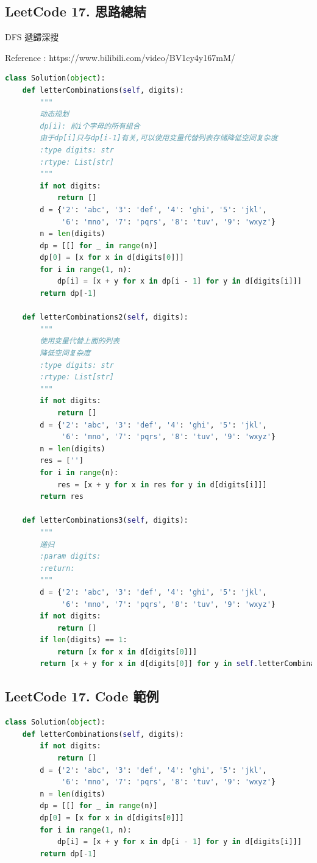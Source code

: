 \documentclass[10pt,UTF8]{ctexart}
\begin{document}
\subsection{LeetCode 17. 思路總結}

DFS 遞歸深搜

Reference : https://www.bilibili.com/video/BV1cy4y167mM/

\begin{lstlisting}[language={python}]
class Solution(object):
    def letterCombinations(self, digits):
        """
        动态规划
        dp[i]: 前i个字母的所有组合
        由于dp[i]只与dp[i-1]有关,可以使用变量代替列表存储降低空间复杂度
        :type digits: str
        :rtype: List[str]
        """
        if not digits:
            return []
        d = {'2': 'abc', '3': 'def', '4': 'ghi', '5': 'jkl',
             '6': 'mno', '7': 'pqrs', '8': 'tuv', '9': 'wxyz'}
        n = len(digits)
        dp = [[] for _ in range(n)]
        dp[0] = [x for x in d[digits[0]]]
        for i in range(1, n):
            dp[i] = [x + y for x in dp[i - 1] for y in d[digits[i]]]
        return dp[-1]

    def letterCombinations2(self, digits):
        """
        使用变量代替上面的列表
        降低空间复杂度
        :type digits: str
        :rtype: List[str]
        """
        if not digits:
            return []
        d = {'2': 'abc', '3': 'def', '4': 'ghi', '5': 'jkl',
             '6': 'mno', '7': 'pqrs', '8': 'tuv', '9': 'wxyz'}
        n = len(digits)
        res = ['']
        for i in range(n):
            res = [x + y for x in res for y in d[digits[i]]]
        return res

    def letterCombinations3(self, digits):
        """
        递归
        :param digits:
        :return:
        """
        d = {'2': 'abc', '3': 'def', '4': 'ghi', '5': 'jkl',
             '6': 'mno', '7': 'pqrs', '8': 'tuv', '9': 'wxyz'}
        if not digits:
            return []
        if len(digits) == 1:
            return [x for x in d[digits[0]]]
        return [x + y for x in d[digits[0]] for y in self.letterCombinations3(digits[1:])]
\end{lstlisting}

\subsection{LeetCode 17. Code 範例}

\begin{lstlisting}[language={python}]
class Solution(object):
    def letterCombinations(self, digits):
        if not digits:
            return []
        d = {'2': 'abc', '3': 'def', '4': 'ghi', '5': 'jkl',
             '6': 'mno', '7': 'pqrs', '8': 'tuv', '9': 'wxyz'}
        n = len(digits)
        dp = [[] for _ in range(n)]
        dp[0] = [x for x in d[digits[0]]]
        for i in range(1, n):
            dp[i] = [x + y for x in dp[i - 1] for y in d[digits[i]]]
        return dp[-1]
\end{lstlisting}
\end{document}
